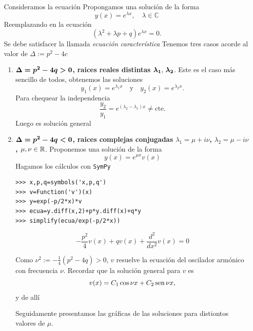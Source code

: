 Consideramos la ecuación
Propongamos una solución de la forma
\[\boxed{y(x)=e^{\lambda x},\quad \lambda\in\mathbb{C}}\]
Reemplazando en la ecuación
\[(\lambda^2+\lambda p+q)e^{\lambda x}=0.\]
Se debe satisfacer la llamada \emph{ecuación característica}
Tenemos tres casos acorde al valor de $\Delta:=p^2-4c$

\begin{enumerate}

\item \noindent \textbf{ $\b{\Delta=p^2-4q>0}$, raices reales distintas $\b{\lambda_1$, $\lambda_2}$}. Este es el caso más sencillo de todos, obtenemos las soluciones
\[y_1(x)=e^{\lambda_1 x}\quad\text{y}\quad y_2(x)=e^{\lambda_2 x}.\]
Para chequear la independencia
\[\frac{y_2}{y_1}=e^{(\lambda_2-\lambda_1)x}\neq\text{cte}.\]
Luego
es solución general


\item \noindent  \textbf{$\b{\Delta=p^2-4q<0}$, raices complejas conjugadas $\lambda_1=\mu+i\nu$, $\lambda_2=\mu-i\nu$, $\mu,\nu\in\rr$}.
Proponemos una solución de la forma
\[
y(x)=e^{\mu x}v(x)
\]
Hagamos los cálculos con \texttt{SymPy}





\begin{lstlisting}
>>> x,p,q=symbols('x,p,q')
>>> v=Function('v')(x)
>>> y=exp(-p/2*x)*v
>>> ecua=y.diff(x,2)+p*y.diff(x)+q*y
>>> simplify(ecua/exp(-p/2*x))

\end{lstlisting}

\[-\frac{p^{2}}{4} v{\left (x \right )} + q v{\left (x \right )} + \frac{d^{2}}{d x^{2}}  v{\left (x \right )}=0
 \]

Como $\nu^2:=-\frac{1}{4}(p^2-4q)>0$, $v$ resuelve  la ecuación del oscilador armónico con frecuencia $\nu$. Recordar que la solución general
para $v$ es
\[v(x)=C_1\cos \nu x +C_2\sen \nu x,\]
y de allí

Seguidamente presentamos las gráficas de las soluciones para distiontos valores de $\mu$.


\end{enumerate}
